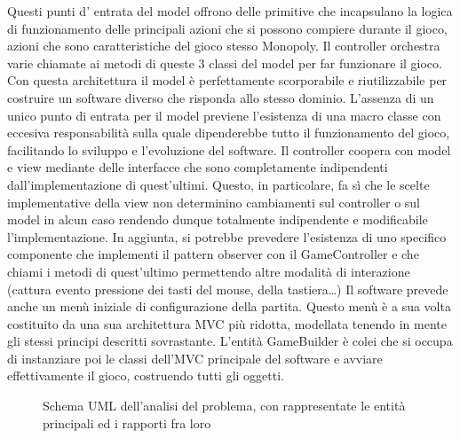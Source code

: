 Questi punti d’ entrata del model offrono delle primitive che incapsulano la logica di funzionamento 
delle principali azioni che si possono compiere durante il gioco, azioni che sono caratteristiche del 
gioco stesso Monopoly. Il controller orchestra varie chiamate ai metodi di queste 3 classi del model per far funzionare
il gioco.
Con questa architettura il model è perfettamente scorporabile e riutilizzabile per costruire 
un software diverso che risponda allo stesso dominio. L'assenza di un unico punto di entrata per il model
previene l'esistenza di una macro classe con eccesiva responsabilità sulla quale dipenderebbe tutto il funzionamento
del gioco, facilitando lo sviluppo e l'evoluzione del software.\newline
Il controller coopera con model e view mediante delle interfacce che sono completamente indipendenti 
dall’implementazione di quest’ultimi. 
Questo, in particolare, fa sì che le scelte implementative della view non determinino cambiamenti sul 
controller o sul model in alcun caso rendendo dunque totalmente
indipendente e modificabile l'implementazione.
In aggiunta, si potrebbe prevedere l'esistenza di uno specifico componente che implementi il pattern observer con il GameController
e che chiami i metodi di quest'ultimo permettendo altre modalità di interazione (cattura evento pressione dei tasti del mouse, della tastiera\dots)
Il software prevede anche un menù iniziale di configurazione della partita. 
Questo menù è a sua volta costituito da una sua architettura MVC più ridotta, 
modellata tenendo in mente gli stessi principi descritti sovrastante. 
L’entità GameBuilder è colei che si occupa di instanziare poi le classi dell’MVC principale del software e avviare effettivamente il gioco,
costruendo tutti gli oggetti.

\begin{figure}[H]
    \centering
    \caption{Schema UML dell'analisi del problema, con rappresentate le entità principali ed i rapporti fra loro}
	\label{img:architecture_diagram}
\end{figure}
